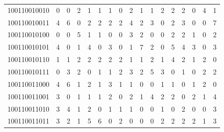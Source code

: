 \documentclass[10pt,a4paper]{article}
\begin{document}
\begin{longtable}{ |c|c|c|c|c|c|c|c|c|c|c|c|c|c|c|c|c| }
    100110010010              & 0                            & 0                                & 2                            & 1                              & 1   & 1   & 0   & 2   & 1   & 1   & 2   & 2   & 2   & 0   & 4   & 1   \\
    100110010011              & 4                            & 6                                & 0                            & 2                              & 2   & 2   & 2   & 4   & 2   & 3   & 0   & 2   & 3   & 0   & 0   & 7   \\
    100110010100              & 0                            & 0                                & 5                            & 1                              & 1   & 0   & 0   & 3   & 2   & 0   & 0   & 2   & 2   & 1   & 0   & 2   \\
    100110010101              & 4                            & 0                                & 1                            & 4                              & 0   & 3   & 0   & 1   & 7   & 2   & 0   & 5   & 4   & 3   & 0   & 3   \\
    100110010110              & 1                            & 1                                & 2                            & 2                              & 2   & 2   & 2   & 1   & 1   & 2   & 1   & 4   & 2   & 1   & 2   & 0   \\
    100110010111              & 0                            & 3                                & 2                            & 0                              & 1   & 1   & 2   & 3   & 2   & 5   & 3   & 0   & 1   & 0   & 2   & 2   \\
    100110011000              & 4                            & 6                                & 1                            & 2                              & 1   & 3   & 1   & 1   & 0   & 0   & 1   & 1   & 0   & 1   & 2   & 0   \\
    100110011001              & 3                            & 0                                & 1                            & 1                              & 1   & 2   & 0   & 2   & 1   & 4   & 2   & 2   & 0   & 2   & 1   & 4   \\
    100110011010              & 3                            & 4                                & 1                            & 2                              & 0   & 1   & 1   & 1   & 0   & 0   & 1   & 0   & 2   & 0   & 0   & 3   \\
    100110011011              & 3                            & 2                                & 1                            & 5                              & 6   & 0   & 2   & 0   & 0   & 0   & 2   & 2   & 2   & 2   & 1   & 3   \\

\end{longtable}
\end{document}
